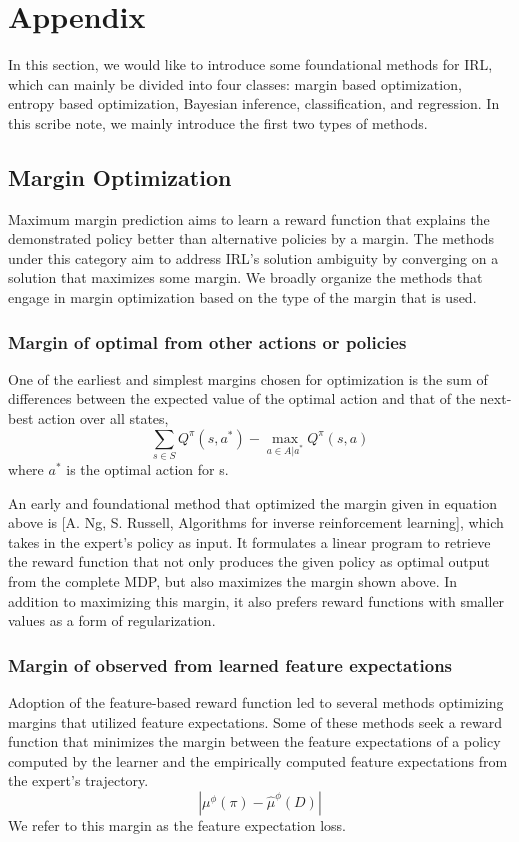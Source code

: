 \documentclass[11pt]{article}
\begin{document}
{


}

\newpage
\section{Appendix}

In this section, we would like to introduce some foundational methods for IRL, which can mainly be divided into four classes: margin based optimization, entropy based optimization, Bayesian inference, classification, and regression. In this scribe note, we mainly introduce the first two types of methods.

\subsection{Margin Optimization}
Maximum margin prediction aims to learn a reward function that explains
the demonstrated policy better than alternative policies by a margin. The
methods under this category aim to address IRL’s solution ambiguity by converging on a solution that maximizes some margin. We broadly organize the methods that engage in margin optimization based on the type of the margin that is used.

\subsubsection{Margin of optimal from other actions or policies}
One of the earliest and simplest margins chosen for optimization is the sum of differences between the expected value of the optimal action and that of the next-best action over all states,
$$ \sum_{s \in S} Q^{\pi} (s, a^*) - \max_{a \in A | {a^*}} Q^{\pi} (s, a)$$
where $a^*$ is the optimal action for s.

An early and foundational method that optimized the margin given in equation above is [A. Ng, S. Russell, Algorithms for inverse reinforcement learning], which takes in the expert’s policy as input. It formulates
a linear program to retrieve the reward function that not only produces the given policy as optimal output from the complete MDP, but also maximizes the margin shown above. In addition to maximizing this margin, it also prefers reward functions with smaller values as a form of regularization.

\subsubsection{Margin of observed from learned feature expectations}
Adoption of the feature-based reward function led to several methods optimizing margins that utilized feature expectations. Some of these methods seek a reward function that minimizes the margin between the feature expectations of a policy computed by the learner and the empirically computed feature expectations from the expert’s trajectory.
$$|\mu^{\phi}(\pi) - \hat{\mu}^{\phi} (D)|$$
We refer to this margin as the feature expectation loss.
\end{document}
